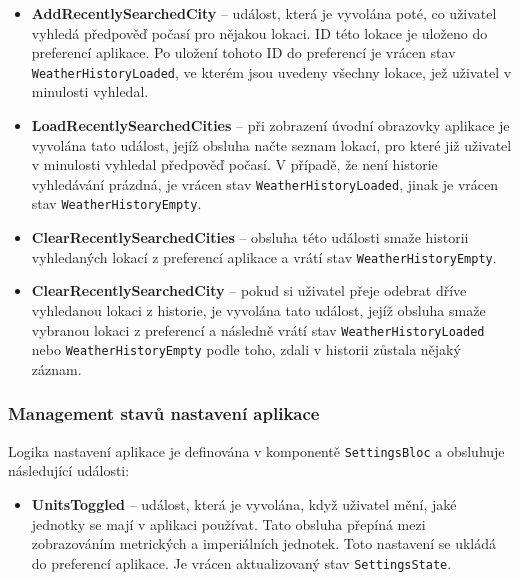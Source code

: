 \documentclass[12pt, a4paper]{article}
\begin{document}
\begin{itemize}

	\item \textbf{AddRecentlySearchedCity} -- událost, která je vyvolána poté, co uživatel vyhledá předpověď počasí pro nějakou lokaci. ID této lokace je uloženo do preferencí aplikace. Po uložení tohoto ID do preferencí je vrácen stav \texttt{WeatherHistoryLoaded}, ve kterém jsou uvedeny všechny lokace, jež uživatel v minulosti vyhledal.

	\item \textbf{LoadRecentlySearchedCities} -- při zobrazení úvodní obrazovky aplikace je vyvolána tato událost, jejíž obsluha načte seznam lokací, pro které již uživatel v minulosti vyhledal předpověď počasí. V případě, že není historie vyhledávání prázdná, je vrácen stav \texttt{WeatherHistoryLoaded}, jinak je vrácen stav \texttt{WeatherHistoryEmpty}.

	\item \textbf{ClearRecentlySearchedCities} -- obsluha této události smaže historii vyhledaných lokací z preferencí aplikace a vrátí stav \texttt{WeatherHistoryEmpty}.

	\item \textbf{ClearRecentlySearchedCity} -- pokud si uživatel přeje odebrat dříve vyhledanou lokaci z historie, je vyvolána tato událost, jejíž obsluha smaže vybranou lokaci z preferencí a následně vrátí stav \texttt{WeatherHistoryLoaded} nebo \texttt{WeatherHistoryEmpty} podle toho, zdali v historii zůstala nějaký záznam.

\end{itemize}


\subsubsection{Management stavů nastavení aplikace}

Logika nastavení aplikace je definována v komponentě \texttt{SettingsBloc} a obsluhuje následující události:

\begin{itemize}

	\item \textbf{UnitsToggled} -- událost, která je vyvolána, když uživatel mění, jaké jednotky se mají v aplikaci používat. Tato obsluha přepíná mezi zobrazováním metrických a imperiálních jednotek. Toto nastavení se ukládá do preferencí aplikace. Je vrácen aktualizovaný stav \texttt{SettingsState}.

\end{itemize}
\end{document}
